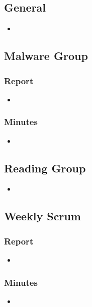 \documentclass{article}
\begin{document}
\subsection*{General}
\begin{itemize}
	\item 
\end{itemize}

\subsection*{Malware Group}
\subsubsection*{Report}
\begin{itemize}
	\item 
\end{itemize}
\subsubsection*{Minutes}
\begin{itemize}
	\item 
\end{itemize}

\subsection*{Reading Group}
\begin{itemize}
	\item 
\end{itemize}

\subsection*{Weekly Scrum}
\subsubsection*{Report}
\begin{itemize}
	\item 
\end{itemize}
\subsubsection*{Minutes}
\begin{itemize}
	\item 
\end{itemize}

\pagebreak
\end{document}
